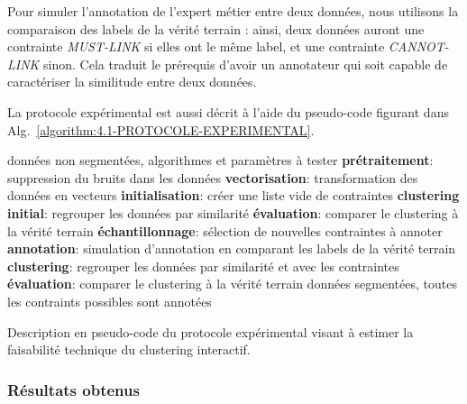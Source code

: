 				Pour simuler l'annotation de l'expert métier entre deux données, nous utilisons la comparaison des labels de la vérité terrain : ainsi, deux données auront une contrainte \textit{MUST-LINK} si elles ont le même label, et une contrainte \textit{CANNOT-LINK} sinon. Cela traduit le prérequis d'avoir un annotateur qui soit capable de caractériser la similitude entre deux données.
				
				
				La protocole expérimental est aussi décrit à l'aide du pseudo-code figurant dans Alg.~\ref{algorithm:4.1-PROTOCOLE-EXPERIMENTAL}.

				\begin{algorithm}
					\begin{algorithmic}[1]
						\Require données non segmentées, algorithmes et paramètres à tester
						\State \textbf{prétraitement}: suppression du bruits dans les données
						\State \textbf{vectorisation}: transformation des données en vecteurs
						\State \textbf{initialisation}: créer une liste vide de contraintes
						\State \textbf{clustering initial}: regrouper les données par similarité
						\State \textbf{évaluation}: comparer le clustering à la vérité terrain
						\Repeat
							\State \textbf{échantillonnage}: sélection de nouvelles contraintes à annoter
							\State \textbf{annotation}: simulation d'annotation en comparant les labels de la vérité terrain
							\State \textbf{clustering}: regrouper les données par similarité et avec les contraintes
							\State \textbf{évaluation}: comparer le clustering à la vérité terrain
						\Ensure données segmentées, toutes les contraints possibles sont annotées
					\end{algorithmic}
					\caption{Description en pseudo-code du protocole expérimental visant à estimer la faisabilité technique du clustering interactif.}
					\label{algorithm:4.1-PROTOCOLE-EXPERIMENTAL}
				\end{algorithm}

			\subsubsection{Résultats obtenus}
				
